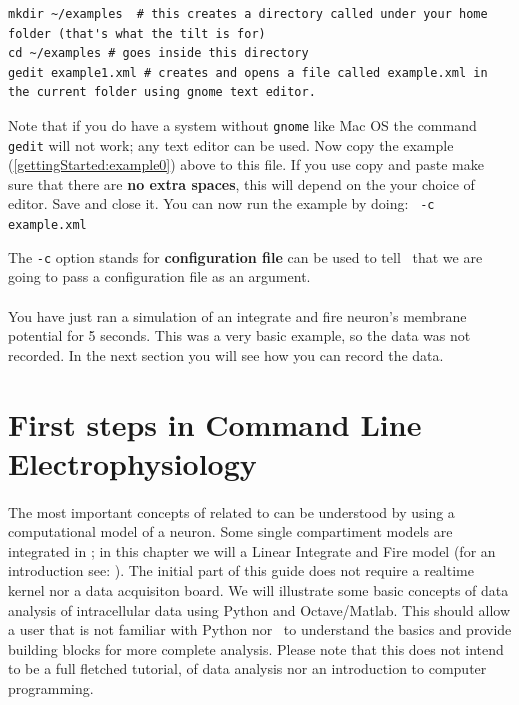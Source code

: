 \begin{lstlisting}[escapeinside=\{\}]
mkdir ~/examples  # this creates a directory called under your home folder (that's what the tilt is for)
cd ~/examples # goes inside this directory
gedit example1.xml # creates and opens a file called example.xml in the current folder using gnome text editor.
\end{lstlisting}

Note that if you do have a system without \texttt{gnome} like Mac OS the command \texttt{gedit} will not work; any text editor can be used. Now copy the example (\ref{gettingStarted:example0}) above to this file. If you use copy and paste make sure that there are \textbf{no extra spaces}, this will depend on the your choice of editor. Save and close it. You can now run the example by doing: \texttt{\progname\ -c example.xml}

The \texttt{-c} option stands for \textbf{configuration file} can be used to tell \progname\ that we are going to pass a configuration file as an argument.

\paragraph{} You have just ran a simulation of an integrate and fire neuron's membrane potential for 5 seconds. This was a very basic example, so the data was not recorded. In the next section you will see how you can record the data.
\fi
\section{First steps in Command Line Electrophysiology}
\paragraph{}
The most important concepts of related to \progname can be understood by using a computational model of a neuron. Some single compartiment models are integrated in \progname; in this chapter we will a Linear Integrate and Fire model (for an introduction see: \cite{Koch:1989}). The initial part of this guide does not require a realtime kernel nor a data acquisiton board.
We will illustrate some basic concepts of data analysis of intracellular data using Python and Octave/Matlab. This should allow a user that is not familiar with Python nor \matlab\ to understand the basics and provide building blocks for more complete analysis. Please note that this does not intend to be a full fletched tutorial, of data analysis nor an introduction to computer programming. 

